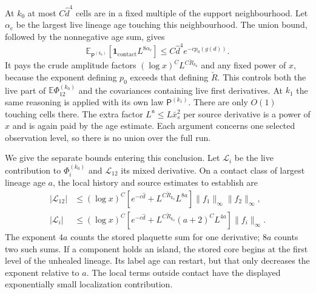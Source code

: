 \documentclass[11pt,letterpaper,reqno]{amsart}
\theoremstyle{definition}
\theoremstyle{remark}
\begin{document}
At $k_0$ at most $C\hat d^4$ cells are in a fixed multiple of the
support neighbourhood. Let $\alpha_{\mathrm c}$ be the largest live
lineage age touching this neighbourhood. The union bound, followed by
the nonnegative age sum, gives
\[
 \mathbb E_{\mathsf P^{(k_0)}}
       [\mathbf1_{\mathrm{contact}}L^{8\alpha_{\mathrm c}}]
       \le C\hat d^4e^{-cp_0(g(d))}.
\]
It pays the crude amplitude factors
$(\log x)^CL^{C\check R_{k_0}}$ and any fixed power of $x$,
because the exponent defining $p_0$ exceeds that defining $\check R$.
This controls both the live part of $\mathbb E\Phi_{12}^{(k_0)}$
and the covariances containing live first derivatives. At $k_1$ the
same reasoning is applied with its own law $\mathsf P^{(k_1)}$.
There are only $O(1)$ touching cells there. The extra factor
$L^{\mathsf n}\le L\bar x_s^2$ per source derivative is a power of
$x$ and is again paid by the age estimate. Each argument concerns one
selected observation level, so there is no union over the full run.

We give the separate bounds entering this conclusion. Let
$\mathcal L_i$ be the live contribution to $\Phi_i^{(k_0)}$ and
$\mathcal L_{12}$ its mixed derivative. On a contact class of
largest lineage age $a$, the local history and source estimates to
establish are
\begin{align*}
 |\mathcal L_{12}|
 &\le(\log x)^C
       [e^{-c\hat d}+L^{C\check R_{k_0}}L^{8a}]
                                      \|f_1\|_\infty\|f_2\|_\infty,\\
 |\mathcal L_i|
 &\le(\log x)^C
       [e^{-c\hat d}+L^{C\check R_{k_0}}(a+2)^CL^{4a}]
                                                   \|f_i\|_\infty.
\end{align*}
The exponent $4a$ counts the stored plaquette sum for one derivative;
$8a$ counts two such sums. If a component holds an island, the stored
core begins at the first level of the unhealed lineage. Its label age
can restart, but that only decreases the exponent relative to $a$.
The local terms outside contact have the displayed exponentially small
localization contribution.
\end{document}
